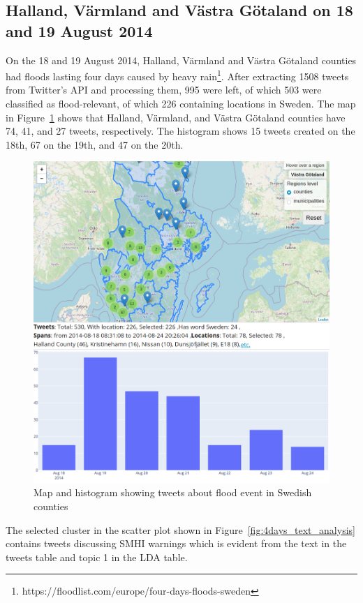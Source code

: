 \subsection{Halland, Värmland and Västra Götaland on 18 and 19 August 2014}
On the 18 and 19 August 2014, Halland, Värmland and Västra Götaland counties had floods lasting four days
caused by heavy rain\footnote{https://floodlist.com/europe/four-days-floods-sweden}. After extracting 1508 tweets from Twitter's API and
processing them, 995 were left, of which 503 were classified as flood-relevant, of which 226
containing locations in Sweden.
The map in Figure~\ref{fig:4days_floods} shows that Halland, Värmland, and Västra Götaland counties
have 74, 41, and 27 tweets, respectively. The histogram shows 15 tweets created on the 18th, 67 on
the 19th, and 47 on the 20th.

\begin{figure}[H]
  \begin{center}
    \includegraphics[width=13cm]{./images/4days_floods.png}
  \end{center}
  \caption{Map and histogram showing tweets about flood event in Swedish counties}
  \label{fig:4days_floods}
\end{figure}

The selected cluster in the scatter plot shown in Figure~\ref{fig:4days_text_analysis} contains tweets discussing \ac{SMHI}
warnings which is evident from the text in the tweets table and topic 1 in the \ac{LDA} table. 

